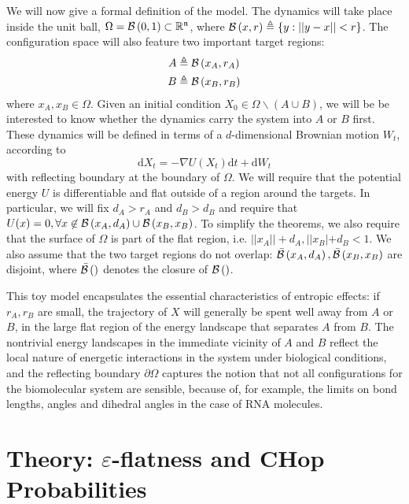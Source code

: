 \documentclass[english, aip, jcp, priprint, graphicx,floatfix]{revtex4-1}
\theoremstyle{plain}
\theoremstyle{definition}
\theoremstyle{plain}
\begin{document}
We will now give a formal definition of the model.  The dynamics will take place inside the unit ball, $\Omega = \mathcal{B}\left(0,1\right)\subset \mathbb{R}^{\mathfrak{n}}$, where $\mathcal{B}\left(x, r\right) \triangleq \{ y : || y - x || < r \}$.  The configuration space will also feature two important target regions:
\begin{align*}
A &\triangleq \mathcal{B}\left(x_A, r_A\right)\\
B &\triangleq \mathcal{B}\left(x_B, r_B\right)
\end{align*}
where $x_A,x_B \in \Omega$.  Given an initial condition $X_0\in \Omega \backslash (A\cup B)$, we will be be interested to know whether the dynamics carry the system into $A$ or $B$ first.  These dynamics will be defined in terms of a $d$-dimensional Brownian motion $W_t$, according to 
\begin{equation} \label{equ:toy_sde}
\mathrm{d} X_t = - \nabla U (X_t) \mathrm{d} t + \mathrm{d} W_t 
\end{equation}
with reflecting boundary at the boundary of $\Omega$.  We will require that the potential energy $U$ is differentiable and flat outside of a region around the targets.  In particular, we will fix $d_A>r_A$ and $d_B>d_B$ and require that $U (x) = 0, \forall x \not\in \mathcal{B}\left(x_A,d_A\right) \cup \mathcal{B}\left(x_B,x_B\right)$.  To simplify the theorems, we also require that the surface of $\Omega$ is part of the flat region, i.e. $||x_A||+d_A,||x_B|+d_B<1$.  We also assume that the two target regions do not overlap: $\mathcal{\bar B}\left(x_A,d_A\right),\mathcal{\bar B}\left(x_B,x_B\right)$ are disjoint, where $\mathcal{\bar B}\left(\right)$ denotes the closure of $\mathcal{B}\left(\right)$.  

This toy model encapsulates the essential characteristics of entropic effects: if $r_A, r_B$ are small, the trajectory of $X$ will generally be spent well away from $A$ or $B$, in the large flat region of the energy landscape that separates $A$ from $B$. The nontrivial energy landscapes in the immediate vicinity of $A$ and $B$ reflect the local nature of energetic interactions in the system under biological conditions, and the reflecting boundary $\partial\Omega$ captures the notion that not all configurations for the biomolecular system are sensible, because of, for example, the limits on bond lengths, angles and dihedral angles in the case of RNA molecules.

\section{Theory: $\varepsilon$-flatness and CHop Probabilities}\label{sec:model_formulation}
\end{document}
